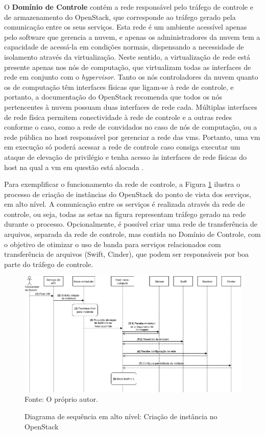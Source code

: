 O \textbf{Domínio de Controle} contém a rede responsável pelo tráfego de controle e de armazenamento do OpenStack, que corresponde ao tráfego gerado pela comunicação entre os seus serviços. 
%
Esta rede é um ambiente acessível apenas pelo software que gerencia a nuvem, e apenas os administradores da nuvem tem a capacidade de acessá-la em condições normais, dispensando a necessidade de isolamento através da virtualização.
%
Neste sentido, a virtualização de rede está presente apenas nos nós de computação, que virtualizam todas as interfaces de rede em conjunto com o \textit{hypervisor}.
%
Tanto os nós controladores da nuvem quanto os de computação têm interfaces físicas que ligam-se à rede de controle, e portanto, a documentação do OpenStack recomenda que todos os nós pertencentes à nuvem possuam duas interfaces de rede cada.
%
Múltiplas interfaces de rede física permitem conectividade à rede de controle e a outras redes conforme o caso, como a rede de convidados no caso de nós de computação, ou a rede pública no host responsável por gerenciar a rede das \acp{vm}.
%
Portanto, uma \ac{vm} em execução só poderá acessar a rede de controle caso consiga executar um ataque de elevação de privilégio e tenha acesso às interfaces de rede físicas do host na qual a \ac{vm} em questão está alocada \cite{Krutz:2010:cloudsecurity}.

Para exemplificar o funcionamento da rede de controle, a Figura \ref{fig:openstack_criacao_instancia} ilustra o processo de criação de instâncias do OpenStack do ponto de vista dos serviços, em alto nível.
%
A comunicação entre os serviços é realizada através da rede de controle, ou seja, todas as setas na figura representam tráfego gerado na rede durante o processo.
%
Opcionalmente, é possível criar uma rede de transferência de arquivos, separada da rede de controle, mas contida no Domínio de Controle, com o objetivo de otimizar o uso de banda para serviços relacionados com transferência de arquivos (Swift, Cinder), que podem ser responsáveis por boa parte do tráfego de controle.

\begin{figure}[!htb]
	\centering
	\caption{Diagrama de sequência em alto nível: Criação de instância no OpenStack}
	\includegraphics[width=1\textwidth]{img/openstack_criacao_instancia.png}
	\label{fig:openstack_criacao_instancia}\\
	Fonte: O próprio autor.
\end{figure}

